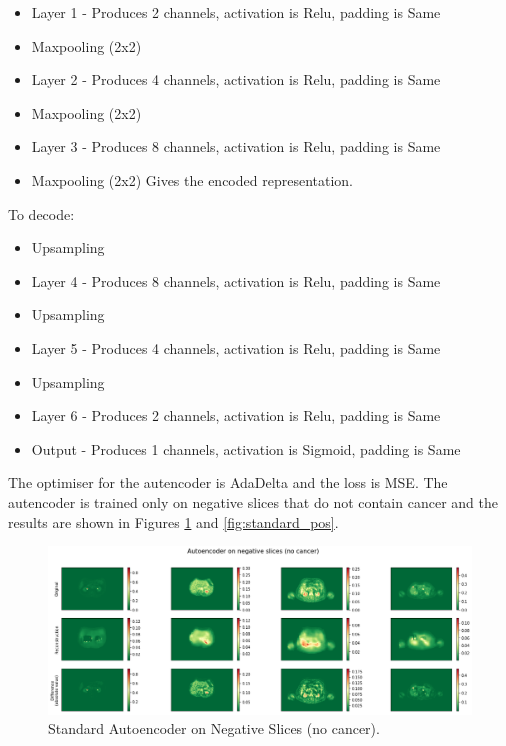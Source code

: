 \begin{itemize}
    \item Layer 1 - Produces 2 channels, activation is Relu, padding is Same
    \item Maxpooling (2x2)
    \item Layer 2 - Produces 4 channels, activation is Relu, padding is Same
    \item Maxpooling (2x2)
    \item Layer 3 - Produces 8 channels, activation is Relu, padding is Same
    \item Maxpooling (2x2) Gives the encoded representation.
\end{itemize}

To decode:
\begin{itemize}
    \item Upsampling
    \item Layer 4 - Produces 8 channels, activation is Relu, padding is Same
    \item Upsampling
    \item Layer 5 - Produces 4 channels, activation is Relu, padding is Same
    \item Upsampling
    \item Layer 6 - Produces 2 channels, activation is Relu, padding is Same
    \item Output - Produces 1 channels, activation is Sigmoid, padding is Same
\end{itemize}

The optimiser for the autencoder is AdaDelta and the loss is MSE.
The autencoder is trained only on negative slices that do not contain cancer and the results are shown in Figures \ref{fig:standard_neg} and \ref{fig:standard_pos}.

\begin{figure}[hbtp!]
    \centering
    \includegraphics[width=\textwidth]{./img/standard_negative.png}
    \caption{Standard Autoencoder on Negative Slices (no cancer).}
    \label{fig:standard_neg}
\end{figure}

